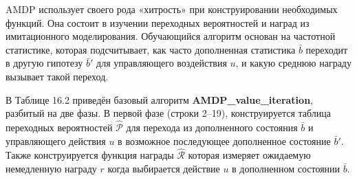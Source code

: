 \documentclass[10pt,a4paper]{article}
\begin{document}
AMDP использует своего рода «хитрость» при конструировании необходимых функций. Она состоит в изучении переходных вероятностей и наград из имитационного моделирования. Обучающийся алгоритм основан на частотной статистике, которая подсчитывает, как часто дополненная статистика $\bar{b}$ переходит в другую гипотезу $\bar{b}'$ для управляющего воздействия $u$, и какую среднюю награду вызывает такой переход.

В Таблице 16.2 приведён базовый алгоритм \textbf{AMDP\_value\_iteration}, разбитый на две фазы. В первой фазе (строки 2–19), конструируется таблица переходных вероятностей $\hat{\mathcal{P}}$ для перехода из дополненного состояния $\bar{b}$ и управляющего действия $u$ в возможное последующее дополненное состояние $\bar{b}'$.  Также конструируется функция награды $\hat{\mathcal{R}}$ которая измеряет ожидаемую немедленную награду $r$ когда выбирается действие $u$ в дополненном состоянии $\bar{b}$.\\
\end{document}
